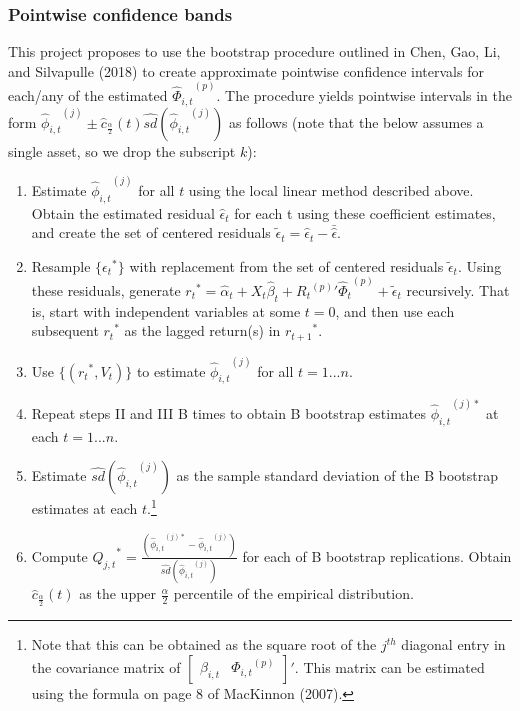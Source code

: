 \documentclass{article}
\begin{document}
\subsubsection{Pointwise confidence bands}
This project proposes to use the bootstrap procedure outlined in Chen, Gao, Li, and Silvapulle (2018) to create approximate pointwise confidence intervals for each/any of the estimated \({{\hat{\Phi}}_{i,t}}^{(p)}\). The procedure yields pointwise intervals in the form \({{\hat{\phi}}_{i,t}}^{(j)} \pm \hat{c}_{\frac{\alpha}{2}}(t) \hat{sd}({{\hat{\phi}}_{i,t}}^{(j)})\) as follows (note that the below assumes a single asset, so we drop the subscript \(k\)):
\renewcommand{\theenumi}{\Roman{enumi}}
\begin{enumerate}
	\item{Estimate \({{\hat{\phi}}_{i,t}}^{(j)}\) for all \(t\) using the local linear method described above. Obtain the estimated residual \(\hat{\epsilon}_{t}\) for each t using these coefficient estimates, and create the set of centered residuals \(\tilde{\epsilon}_{t} = \hat{\epsilon}_{t} - \bar{\hat{\epsilon}}\).}
	\item{Resample \( \{ {\epsilon_{t}}^{*} \} \) with replacement from the set of centered residuals \(\tilde{\epsilon}_{t}\). Using these residuals, generate \({r_{t}}^{*} =  \hat{\alpha}_{t} + X_{t}\hat{\beta}_{t} + {{R_{t}}^{(p)}}' {\hat{\Phi}_{t}}^{(p)} + \tilde{\epsilon}_{t}\) recursively. That is, start with independent variables at some \(t = 0\), and then use each subsequent \({r_{t}}^{*}\) as the lagged return(s) in \({r_{t+1}}^{*}\).}
	\item{Use \( \{ ({r_{t}}^{*}, V_{t})\}\) to estimate \({{\hat{\phi}}_{i,t}}^{(j)}\) for all \(t = 1 ... n\).}
	\item{Repeat steps II and III B times to obtain B bootstrap estimates \({{\hat{\phi}}_{i,t}}^{(j)*}\) at each \(t = 1 ... n\).}
	\item{Estimate \(\hat{sd}({{\hat{\phi}}_{i,t}}^{(j)})\) as the sample standard deviation of the B bootstrap estimates at each \(t\).\footnote{Note that this can be obtained as the square root of the \(j^{th}\) diagonal entry in the covariance matrix of \({\begin{bmatrix}\beta_{i,t} &{\Phi_{i,t}}^{(p)}\end{bmatrix}}' \). This matrix can be estimated using the formula on page 8 of MacKinnon (2007).} }
	\item{Compute \({Q_{j,t}}^{*} = \frac{({{\hat{\phi}}_{i,t}}^{(j)*} - {{\hat{\phi}}_{i,t}}^{(j)})}{\hat{sd}({{\hat{\phi}}_{i,t}}^{(j)})} \) for each of B bootstrap replications. Obtain \(\hat{c}_{\frac{\alpha}{2}}(t)\) as the upper \(\frac{\alpha}{2}\) percentile of the empirical distribution.} 
\end{enumerate}
\end{document}
